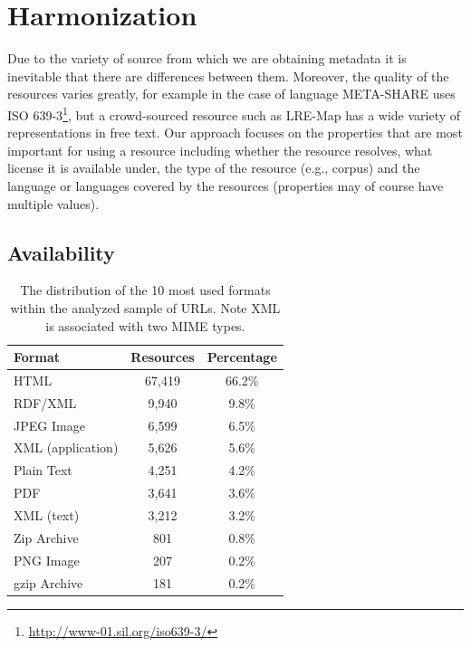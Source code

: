 \documentclass[smallextended]{svjour3}       %
\begin{document}
\section{Harmonization}

\label{harmonization}

Due to the variety of source from which we are obtaining metadata it is
inevitable that there are differences between them. Moreover, the quality of the
resources varies greatly, for example in the case of language META-SHARE uses
ISO 639-3\footnote{\url{http://www-01.sil.org/iso639-3/}}, but a crowd-sourced
resource such as LRE-Map has a wide variety of representations in free text. Our
approach focuses on the properties that are most important for using a resource
including whether the resource resolves, what license it is available under, the
type of the resource (e.g., corpus) and the language or languages covered by the
resources (properties may of course have multiple values).

\subsection{Availability}

\begin{table}
    \begin{center}
	\begin{tabular}{l|cc}
            Format   & Resources  & Percentage\\
		
		\hline                                              
                HTML                &	67,419 & 66.2\%\\
                RDF/XML             &	9,940  & 9.8\% \\
                JPEG Image          &   6,599  & 6.5\% \\
                XML (application)   &	5,626  & 5.6\% \\
                Plain Text          & 4,251    & 4.2\% \\
                PDF                 &	3,641  & 3.6\% \\
                XML (text)          & 3,212    & 3.2\% \\
                Zip Archive         &	801    & 0.8\% \\
                PNG Image           & 207      & 0.2\% \\
                gzip Archive        & 181      & 0.2\% \\
	\end{tabular}
    \end{center}
	\caption{\label{tab:formats}The distribution of the 10 most used formats within the
        analyzed sample of URLs. Note XML is associated with two MIME types.}
\end{table}
\end{document}
